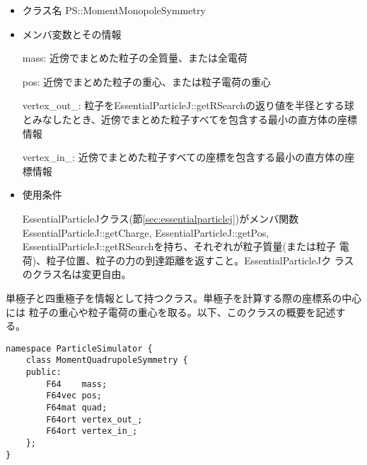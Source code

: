 \begin{itemize}
\item クラス名
  PS::MomentMonopoleSymmetry

\item メンバ変数とその情報

  mass: 近傍でまとめた粒子の全質量、または全電荷

  pos: 近傍でまとめた粒子の重心、または粒子電荷の重心
  
  vertex\_out\_: 粒子をEssentialParticleJ::getRSearchの返り値を半径とする球とみなしたとき、近傍でまとめた粒子すべてを包含する最小の直方体の座標情報
  
  vertex\_in\_: 近傍でまとめた粒子すべての座標を包含する最小の直方体の座標情報

\item 使用条件

  EssentialParticleJクラス(節\ref{sec:essentialparticlej})がメンバ関数
  EssentialParticleJ::getCharge, EssentialParticleJ::getPos,
  EssentialParticleJ::getRSearchを持ち、それぞれが粒子質量(または粒子
  電荷)、粒子位置、粒子の力の到達距離を返すこと。EssentialParticleJク
  ラスのクラス名は変更自由。

\end{itemize}

\label{sec:MomentQuadrupoleSymmetry}

単極子と四重極子を情報として持つクラス。単極子を計算する際の座標系の中心には
粒子の重心や粒子電荷の重心を取る。以下、このクラスの概要を記述する。
\begin{screen}
\begin{verbatim}
namespace ParticleSimulator {
    class MomentQuadrupoleSymmetry {
    public:
        F64    mass;
        F64vec pos;
        F64mat quad;
        F64ort vertex_out_;
        F64ort vertex_in_;
    };
}
\end{verbatim}
\end{screen}

